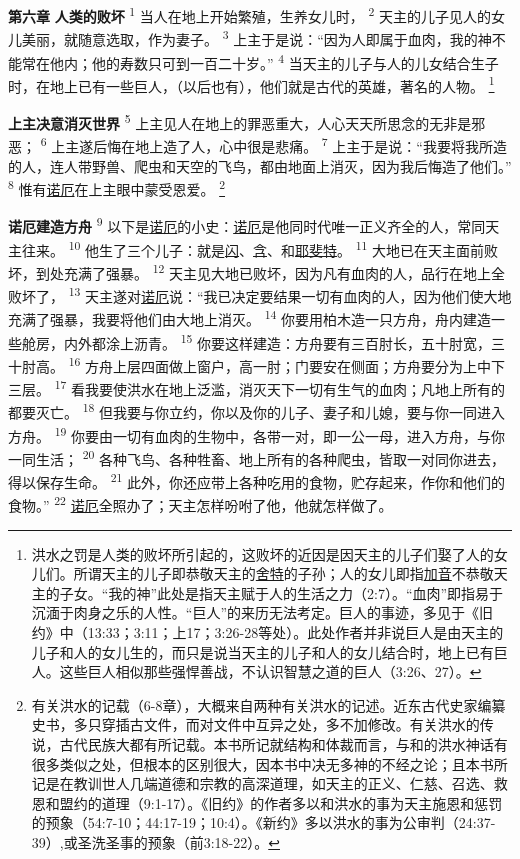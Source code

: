 \textbf{第六章 }
\textbf{人类的败坏 }
\textsuperscript{1}
当人在地上开始繁殖，生养女儿时，
\textsuperscript{2}
天主的儿子见人的女儿美丽，就随意选取，作为妻子。
\textsuperscript{3}
上主于是说：“因为人即属于血肉，我的神不能常在他内；他的寿数只可到一百二十岁。”
\textsuperscript{4}
当天主的儿子与人的儿女结合生子时，在地上已有一些巨人，（以后也有），他们就是古代的英雄，著名的人物。
\footnote{洪水之罚是人类的败坏所引起的，这败坏的近因是因天主的儿子们娶了人的女儿们。所谓天主的儿子即恭敬天主的\uline{舍特}的子孙；人的女儿即指\uline{加音}不恭敬天主的子女。“我的神”此处是指天主赋于人的生活之力（2:7）。“血肉”即指易于沉湎于肉身之乐的人性。“巨人”的来历无法考定。巨人的事迹，多见于《旧约》中（13:33；3:11；上17；3:26-28等处）。此处作者并非说巨人是由天主的儿子和人的女儿生的，而只是说当天主的儿子和人的女儿结合时，地上已有巨人。这些巨人相似那些强悍善战，不认识智慧之道的巨人（3:26、27）。}

\textbf{上主决意消灭世界 }
\textsuperscript{5}
上主见人在地上的罪恶重大，人心天天所思念的无非是邪恶；
\textsuperscript{6}
上主遂后悔在地上造了人，心中很是悲痛。
\textsuperscript{7}
上主于是说：“我要将我所造的人，连人带野兽、爬虫和天空的飞鸟，都由地面上消灭，因为我后悔造了他们。”
\textsuperscript{8}
惟有\uline{诺厄}在上主眼中蒙受恩爱。
\footnote{有关洪水的记载（6-8章），大概来自两种有关洪水的记述。近东古代史家编纂史书，多只穿插古文件，而对文件中互异之处，多不加修改。有关洪水的传说，古代民族大都有所记载。本书所记就结构和体裁而言，与和的洪水神话有很多类似之处，但根本的区别很大，因本书中决无多神的不经之论；且本书所记是在教训世人几端道德和宗教的高深道理，如天主的正义、仁慈、召选、救恩和盟约的道理（9:1-17）。《旧约》的作者多以和洪水的事为天主施恩和惩罚的预象（54:7-10；44:17-19；10:4）。《新约》多以洪水的事为公审判（24:37-39）,或圣洗圣事的预象（前3:18-22）。}

\textbf{诺厄建造方舟 }
\textsuperscript{9}
以下是\uline{诺厄}的小史：\uline{诺厄}是他同时代唯一正义齐全的人，常同天主往来。
\textsuperscript{10}
他生了三个儿子：就是\uline{闪}、\uline{含}、和\uline{耶斐特}。
\textsuperscript{11}
大地已在天主面前败坏，到处充满了强暴。
\textsuperscript{12}
天主见大地已败坏，因为凡有血肉的人，品行在地上全败坏了，
\textsuperscript{13}
天主遂对\uline{诺厄}说：“我已决定要结果一切有血肉的人，因为他们使大地充满了强暴，我要将他们由大地上消灭。
\textsuperscript{14}
你要用柏木造一只方舟，舟内建造一些舱房，内外都涂上沥青。
\textsuperscript{15}
你要这样建造：方舟要有三百肘长，五十肘宽，三十肘高。
\textsuperscript{16}
方舟上层四面做上窗户，高一肘；门要安在侧面；方舟要分为上中下三层。
\textsuperscript{17}
看我要使洪水在地上泛滥，消灭天下一切有生气的血肉；凡地上所有的都要灭亡。
\textsuperscript{18}
但我要与你立约，你以及你的儿子、妻子和儿媳，要与你一同进入方舟。
\textsuperscript{19}
你要由一切有血肉的生物中，各带一对，即一公一母，进入方舟，与你一同生活；
\textsuperscript{20}
各种飞鸟、各种牲畜、地上所有的各种爬虫，皆取一对同你进去，得以保存生命。
\textsuperscript{21}
此外，你还应带上各种吃用的食物，贮存起来，作你和他们的食物。”
\textsuperscript{22}
\uline{诺厄}全照办了；天主怎样吩咐了他，他就怎样做了。

